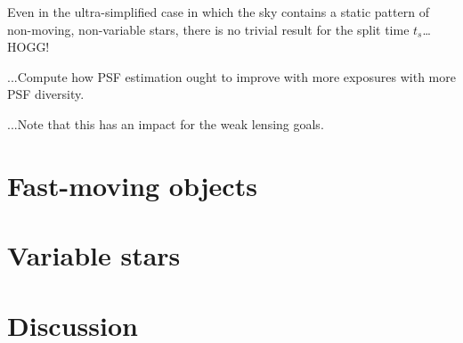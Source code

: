 \documentclass[12pt]{article}
\begin{document}
Even in the ultra-simplified case in which the sky contains a static
pattern of non-moving, non-variable stars, there is no trivial result for
the split time $t_s$\ldots HOGG!

...Compute how PSF estimation ought to improve with more exposures with
more PSF diversity.

...Note that this has an impact for the weak lensing goals.

\section{Fast-moving objects}

\section{Variable stars}

\section{Discussion}
\end{document}
